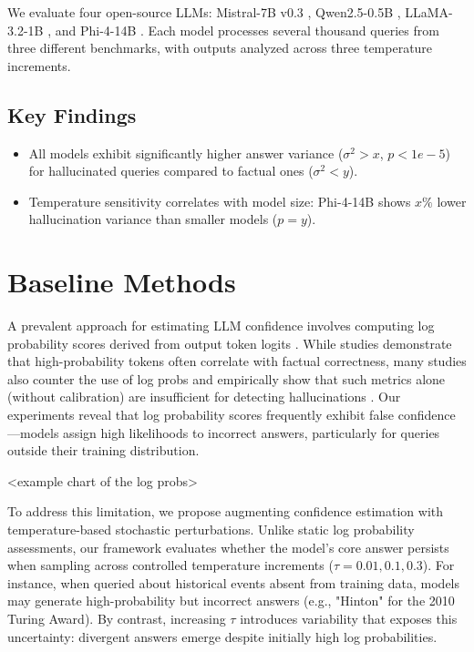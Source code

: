 \documentclass[sigconf]{acmart}
\begin{document}
We evaluate four open-source LLMs: Mistral-7B v0.3 \cite{mistral_7b}, Qwen2.5-0.5B \cite{Qwen2.5}, LLaMA-3.2-1B \cite{llama_3.2}, and Phi-4-14B \cite{phi_4}. Each model processes several thousand queries from three different benchmarks, with outputs analyzed across three temperature increments.

\subsection{Key Findings}
\begin{itemize}
    \item All models exhibit significantly higher answer variance ($\sigma^2 > x$, $p < 1e-5$) for hallucinated queries compared to factual ones ($\sigma^2 < y$).
    \item Temperature sensitivity correlates with model size: Phi-4-14B shows $x\%$ lower hallucination variance than smaller models ($p = y$).
\end{itemize}


\section{Baseline Methods}

A prevalent approach for estimating LLM confidence involves computing log probability scores derived from output token logits \cite{emnlp_2015}. While studies \cite{strength_in_numbers} demonstrate that high-probability tokens often correlate with factual correctness, many studies also counter the use of log probs and empirically show that such metrics alone (without calibration) are insufficient for detecting hallucinations \cite{cycles_thought,calibrated_hallucinate}. Our experiments reveal that log probability scores frequently exhibit false confidence—models assign high likelihoods to incorrect answers, particularly for queries outside their training distribution.

<example chart of the log probs>

To address this limitation, we propose augmenting confidence estimation with temperature-based stochastic perturbations. Unlike static log probability assessments, our framework evaluates whether the model's core answer persists when sampling across controlled temperature increments ($\tau = 0.01, 0.1, 0.3$). For instance, when queried about historical events absent from training data, models may generate high-probability but incorrect answers (e.g., "Hinton" for the 2010 Turing Award). By contrast, increasing $\tau$ introduces variability that exposes this uncertainty: divergent answers emerge despite initially high log probabilities.
\end{document}
